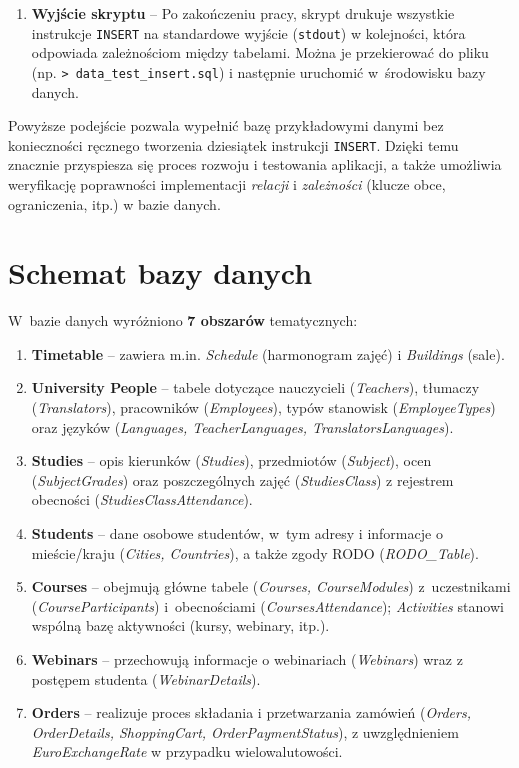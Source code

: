 \documentclass[12pt]{article}
\begin{document}
\begin{enumerate}
    \item \textbf{Wyjście skryptu} -- Po zakończeniu pracy, skrypt drukuje wszystkie instrukcje \texttt{INSERT} na standardowe wyjście (\texttt{stdout}) w kolejności, która odpowiada zależnościom między tabelami. Można je przekierować do pliku (np. \texttt{> data\_test\_insert.sql}) i następnie uruchomić w~środowisku bazy danych.
\end{enumerate}
Powyższe podejście pozwala wypełnić bazę przykładowymi danymi bez konieczności ręcznego tworzenia dziesiątek instrukcji \texttt{INSERT}. 
Dzięki temu znacznie przyspiesza się proces rozwoju i testowania aplikacji, a także umożliwia weryfikację poprawności implementacji \emph{relacji} i \emph{zależności} (klucze obce, ograniczenia, itp.) w bazie danych.
\newpage
\section{Schemat bazy danych}

W~bazie danych wyróżniono \textbf{7 obszarów} tematycznych:
\begin{enumerate}
  \item \textbf{Timetable} -- zawiera m.in. \emph{Schedule} (harmonogram zajęć) i \emph{Buildings} (sale).
  \item \textbf{University People} -- tabele dotyczące nauczycieli (\emph{Teachers}), tłumaczy (\emph{Translators}), 
        pracowników (\emph{Employees}), typów stanowisk (\emph{EmployeeTypes}) oraz języków (\emph{Languages, TeacherLanguages, TranslatorsLanguages}).
  \item \textbf{Studies} -- opis kierunków (\emph{Studies}), przedmiotów (\emph{Subject}), ocen (\emph{SubjectGrades}) 
        oraz poszczególnych zajęć (\emph{StudiesClass}) z rejestrem obecności (\emph{StudiesClassAttendance}).
  \item \textbf{Students} -- dane osobowe studentów, w~tym adresy i informacje o mieście/kraju (\emph{Cities, Countries}), 
        a także zgody RODO (\emph{RODO\_Table}).
  \item \textbf{Courses} -- obejmują główne tabele (\emph{Courses, CourseModules}) z~uczestnikami (\emph{CourseParticipants}) 
        i~obecnościami (\emph{CoursesAttendance}); \emph{Activities} stanowi wspólną bazę aktywności (kursy, webinary, itp.).
  \item \textbf{Webinars} -- przechowują informacje o webinariach (\emph{Webinars}) wraz z postępem studenta (\emph{WebinarDetails}).
  \item \textbf{Orders} -- realizuje proces składania i przetwarzania zamówień (\emph{Orders, OrderDetails, ShoppingCart, OrderPaymentStatus}), 
        z uwzględnieniem \emph{EuroExchangeRate} w przypadku wielowalutowości.
\end{enumerate}
\end{document}
